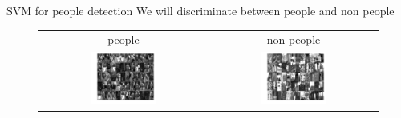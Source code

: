\begin{frame}{SVM for people detection}
We will discriminate between people and non people
\begin{figure}
\begin{tabular}{cc}
\small{people} & \small{non people}\\
\includegraphics[width=0.4\textwidth]{img/people_classification/people.pdf}&
\includegraphics[width=0.4\textwidth]{img/people_classification/non_people.pdf}
\end{tabular}
\end{figure}
\end{frame}